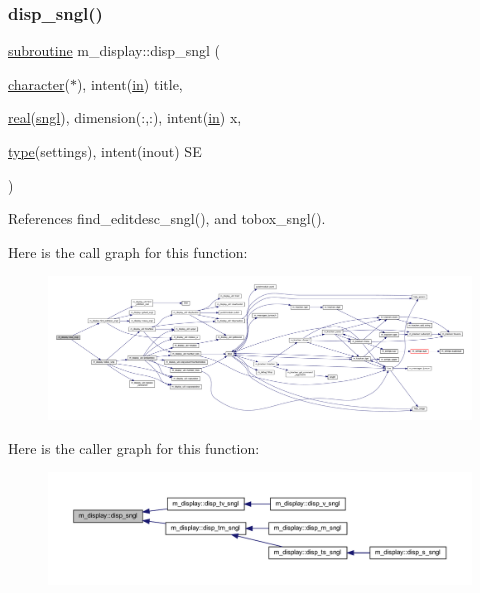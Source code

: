 \subsubsection{\texorpdfstring{disp\+\_\+sngl()}{disp\_sngl()}}
{\footnotesize\ttfamily \hyperlink{M__stopwatch_83_8txt_acfbcff50169d691ff02d4a123ed70482}{subroutine} m\+\_\+display\+::disp\+\_\+sngl (\begin{DoxyParamCaption}\item[{\hyperlink{option__stopwatch_83_8txt_abd4b21fbbd175834027b5224bfe97e66}{character}($\ast$), intent(\hyperlink{M__journal_83_8txt_afce72651d1eed785a2132bee863b2f38}{in})}]{title,  }\item[{\hyperlink{read__watch_83_8txt_abdb62bde002f38ef75f810d3a905a823}{real}(\hyperlink{namespacem__display_a2ac86bc535c3ccc5947dbb3109c666b5}{sngl}), dimension(\+:,\+:), intent(\hyperlink{M__journal_83_8txt_afce72651d1eed785a2132bee863b2f38}{in})}]{x,  }\item[{\hyperlink{stop__watch_83_8txt_a70f0ead91c32e25323c03265aa302c1c}{type}(settings), intent(inout)}]{SE }\end{DoxyParamCaption})\hspace{0.3cm}{\ttfamily [private]}}



References find\+\_\+editdesc\+\_\+sngl(), and tobox\+\_\+sngl().

Here is the call graph for this function\+:
\nopagebreak
\begin{figure}[H]
\begin{center}
\leavevmode
\includegraphics[width=350pt]{namespacem__display_a1e0883cef47c57b43c8de794fe7724ff_cgraph}
\end{center}
\end{figure}
Here is the caller graph for this function\+:
\nopagebreak
\begin{figure}[H]
\begin{center}
\leavevmode
\includegraphics[width=350pt]{namespacem__display_a1e0883cef47c57b43c8de794fe7724ff_icgraph}
\end{center}
\end{figure}
\mbox{\label{namespacem__display_aa95be71bcd8730f4f01393ea6ede4bec}} 
